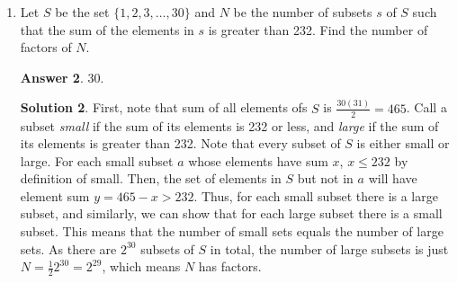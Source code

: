 \documentclass[11pt]{article}
\theoremstyle{definition}
\newtheorem*{solution}{Solution}
\newtheorem*{answer}{Answer}
\begin{document}
\begin{enumerate}
\begin{answer}
200.
\end{answer}
\begin{solution} There are 11 letters total, whose repetitions only include 3 $H$'s, 2 $I$'s, and 2 $O$'s. Thus, $N = \frac{11!}{3! 2! 2}$, as simply arranging the 11 letters treats each letter as distinct, requiring division by factorials to compensate. $N$ contains exactly two powers of 10 and so will end in exactly 2 zeroes. The third-to-last digit is that of 
\begin{align*}
N &= \frac{11 \cdot 10 \cdot 9 \cdot 8 \cdot 7 \cdot 6 \cdot 5 \cdot 4 \cdot 3 \cdot 2}{6 \cdot 2 \cdot 2 \cdot 100} \\
&= 11 \cdot 9 \cdot 7 \cdot 4 \cdot 3 \cdot 2
\end{align*}
whose last digit is 2. Thus the last three digits are $\boxed{200}$.

\end{solution}

\item Let $S$ be the set $\{1, 2, 3,\ldots, 30\}$ and $N$ be the number of subsets $s$ of $S$ such that the sum of the elements in $s$ is greater than 232. Find the number of factors of $N$. %

\begin{answer}
30.
\end{answer}
\begin{solution} First, note that sum of all elements ofs $S$ is $\frac{30(31)}{2} = 465$. Call a subset \emph{small} if the sum of its elements is 232 or less, and \emph{large} if the sum of its elements is greater than 232. Note that every subset of $S$ is either small or large. For each small subset $a$ whose elements have sum $x$, $x \leq 232$ by definition of small. Then, the set of elements in $S$ but not in $a$ will have element sum $y = 465 - x > 232$. Thus, for each small subset there is a large subset, and similarly, we can show that for each large subset there is a small subset. This means that the number of small sets equals the number of large sets. As there are $2^{30}$ subsets of $S$ in total, the number of large subsets is just $N =\frac{1}{2} 2^{30} = 2^{29}$, which means $N$ has  factors.

\end{solution}

\end{enumerate}
\end{document}

